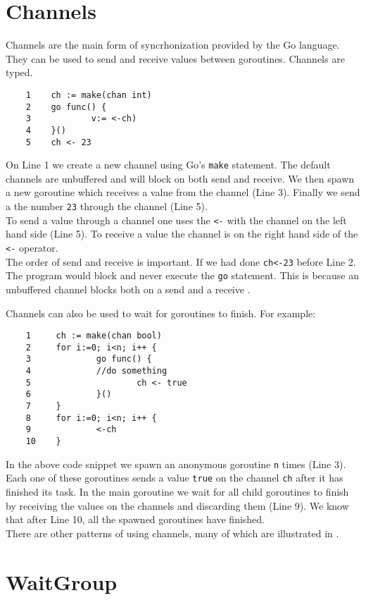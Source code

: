 \documentclass[8pt, twocolumn]{article}
\begin{document}
\section{Channels}
Channels are the main form of syncrhonization provided by the Go
language. They can be used to send and receive values between
goroutines. Channels are typed.
\begin{verbatim}
    1    ch := make(chan int)                         
    2    go func() {
    3            v:= <-ch)
    4    }()
    5    ch <- 23  
\end{verbatim}
On Line 1 we create a new channel using Go's \verb=make=
statement. The default channels are unbuffered and will block on both
send and receive. We then spawn a new goroutine which receives a value
from the channel (Line 3). Finally we send a the number \verb=23=
through the channel (Line 5).\\

To send a value through a channel one uses the \verb=<-= with
the channel on the left hand side (Line 5). To receive a value the
channel is on the right hand side of the \verb=<-= operator. \\

The order of send and receive is important. If we had done
\verb=ch<-23= before Line 2. The program would block and never execute
the \verb=go= statement. This is because an unbuffered channel blocks
both on a send and a receive \cite{effectivego}.

Channels can also be used to wait for goroutines to finish. For
example:
\begin{verbatim}
    1     ch := make(chan bool)
    2     for i:=0; i<n; i++ {
    3             go func() {
    4             //do something
    5                     ch <- true
    6             }()
    7     }
    8     for i:=0; i<n; i++ {
    9             <-ch 
    10    } 
\end{verbatim}
In the above code snippet we spawn an anonymous goroutine \verb=n=
times (Line 3). Each one of these goroutines sends a value \verb=true=
on the channel \verb=ch= after it has finished its task. In the main
goroutine we wait for all child goroutines to finish by receiving the
values on the channels and discarding them (Line 9). We know that
after Line 10, all the spawned goroutines have finished.\\

There are other patterns of using channels, many of
which are illustrated in \cite{effectivego}.

\section{WaitGroup}
\end{document}
